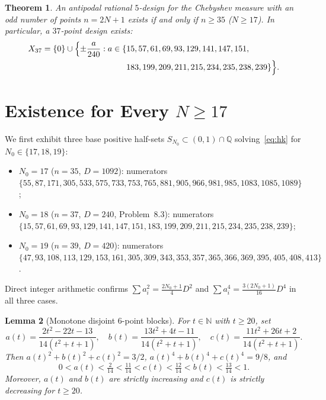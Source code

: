\documentclass[11pt]{article}
\newtheorem{theorem}{Theorem}
\newtheorem{lemma}[theorem]{Lemma}
\begin{document}
\begin{theorem}\label{thm:main}
An antipodal rational $5$-design for the Chebyshev measure with an odd number of
points $n = 2N + 1$ exists if and only if $n \ge 35$ ($N \ge 17$). In
particular, a $37$-point design exists:
\begin{align*}
X_{37} = \{0\} \cup \Bigl\{\pm \frac{a}{240} : a \in \{&15,57,61,69,93,129,141,147,151,\\
&183,199,209,211,215,234,235,238,239\}\Bigr\}.
\end{align*}
\end{theorem}

\section{Existence for Every $N \ge 17$}

We first exhibit three base positive half-sets $S_{N_0} \subset (0, 1) \cap \mathbb{Q}$
solving~\eqref{eq:hk} for $N_0 \in \{17, 18, 19\}$:
\begin{itemize}
\item $N_0 = 17$ ($n = 35$, $D = 1092$): numerators\\
$\{55, 87, 171, 305, 533, 575, 733, 753, 765, 881, 905, 966, 981, 985, 1083, 1085, 1089\}$;
\item $N_0 = 18$ ($n = 37$, $D = 240$, Problem~8.3): numerators\\
$\{15, 57, 61, 69, 93, 129, 141, 147, 151, 183, 199, 209, 211, 215, 234, 235, 238, 239\}$;
\item $N_0 = 19$ ($n = 39$, $D = 420$): numerators\\
$\{47, 93, 108, 113, 129, 153, 161, 305, 309, 343, 353, 357, 365, 366, 369, 395, 405, 408, 413\}$.
\end{itemize}
Direct integer arithmetic confirms $\sum a_i^2 = \frac{2N_0+1}{4} D^2$ and
$\sum a_i^4 = \frac{3(2N_0+1)}{16} D^4$ in all three cases.

\begin{lemma}[Monotone disjoint $6$-point blocks]\label{lem:blocks}
For $t \in \mathbb{N}$ with $t \ge 20$, set
\[
a(t) = \frac{2t^2 - 22t - 13}{14(t^2 + t + 1)},
\quad
b(t) = \frac{13t^2 + 4t - 11}{14(t^2 + t + 1)},
\quad
c(t) = \frac{11t^2 + 26t + 2}{14(t^2 + t + 1)}.
\]
Then $a(t)^2 + b(t)^2 + c(t)^2 = 3/2$, $a(t)^4 + b(t)^4 + c(t)^4 = 9/8$, and
\[
0 < a(t) < \tfrac{2}{14} < \tfrac{11}{14} < c(t) < \tfrac{12}{14} < b(t) < \tfrac{13}{14} < 1.
\]
Moreover, $a(t)$ and $b(t)$ are strictly increasing and $c(t)$ is strictly
decreasing for $t \ge 20$.
\end{lemma}
\end{document}
